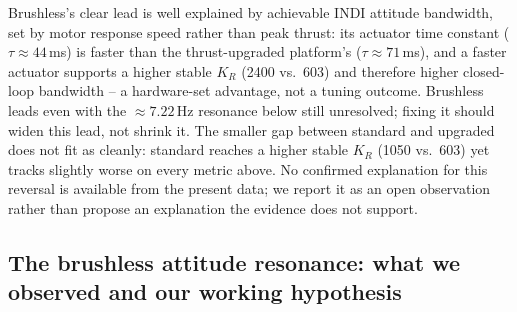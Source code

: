 \documentclass[11pt,a4paper]{article}
\begin{document}
Brushless's clear lead is well explained by achievable INDI attitude bandwidth, set by motor
response speed rather than peak thrust: its actuator time constant ($\tau\approx44$\,ms) is
faster than the thrust-upgraded platform's ($\tau\approx71$\,ms), and a faster actuator supports a
higher stable $K_R$ (2400 vs.\ 603) and therefore higher closed-loop bandwidth -- a hardware-set
advantage, not a tuning outcome. Brushless leads even with the $\approx7.22$\,Hz resonance below
still unresolved; fixing it should widen this lead, not shrink it. The smaller gap between
standard and upgraded does not fit as cleanly: standard reaches a higher
stable $K_R$ (1050 vs.\ 603) yet tracks slightly worse on every metric above. No confirmed
explanation for this reversal is available from the present data; we report it as an open
observation rather than propose an explanation the evidence does not support.

\subsection{The brushless attitude resonance: what we observed and our working hypothesis}
\label{sec:shake-root-cause}
\end{document}
